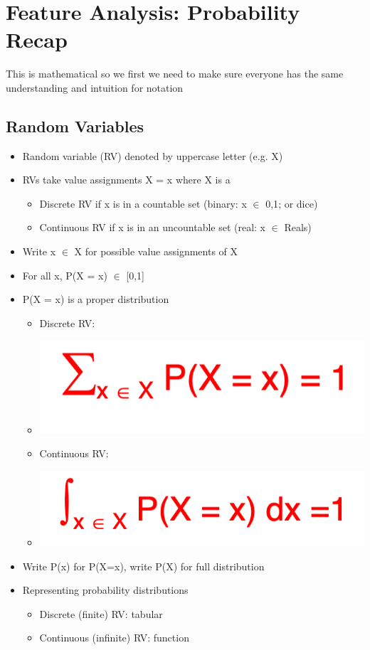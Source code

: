 \documentclass[11pt]{article}
\theoremstyle{definition}
\begin{document}
\section{Feature Analysis: Probability Recap}
This is mathematical so we first
we need to make sure everyone
has the same understanding and
intuition for notation
\subsection{Random Variables}
\begin{itemize}
  \item Random variable (RV) denoted by uppercase letter (e.g. X)
  \item RVs take value assignments X = x where X is a
  \begin{itemize}
    \item Discrete RV if x is in a countable set (binary: x $\in$ {0,1}; or dice)
    \item Continuous RV if x is in an uncountable set (real: x $\in$ Reals)
  \end{itemize}
  \item Write x $\in$ X for possible value assignments of X
  \item For all x, P(X = x) $\in$ [0,1]
  \item P(X = x) is a proper distribution
  \begin{itemize}
    \item Discrete RV: 
    \item \includegraphics[width=\textwidth/4]{7.png}
    \item Continuous RV:
    \item \includegraphics[width=\textwidth/4]{8.png}
  \end{itemize}
  \item Write P(x) for P(X=x), write P(X) for full distribution
  \item Representing probability distributions
  \begin{itemize}
    \item Discrete (finite) RV: tabular
    \item Continuous (infinite) RV: function
  \end{itemize}
\end{itemize}
\end{document}
